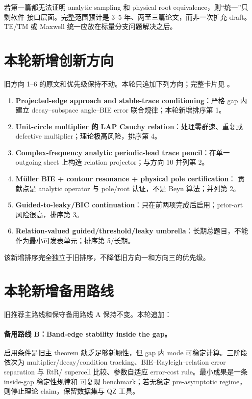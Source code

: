 \documentclass[UTF8,11pt,fontset=none]{ctexart}
\begin{document}
若第一篇都无法证明 analytic sampling 和 physical root equivalence，则“统一”只剩软件
接口层面。完整范围预计是 3--5 年、两至三篇论文，而非一次扩充 draft。TE/TM 或 Maxwell
统一应放在标量分支问题解决之后。

\section{本轮新增创新方向}

旧方向 1--6 的原文和优先级保持不动。本轮只追加下列方向；完整卡片见
。

\begin{enumerate}[start=7]
  \item \textbf{Projected-edge approach and stable-trace conditioning}：严格 gap
    内建立 decay--subspace angle--BIE error 联合规律；本轮新增排序第 1。
  \item \textbf{Unit-circle multiplier 的 LAP Cauchy relation}：处理零群速、重复或
    defective multiplier；理论极高风险，排序第 4。
  \item \textbf{Complex-frequency analytic periodic-lead trace pencil}：在单一
    outgoing sheet 上构造 relation projector；与方向 10 并列第 2。
  \item \textbf{Müller BIE + contour resonance + physical pole certification}：
    贡献点是 analytic operator 与 pole/root 认证，不是 Beyn 算法；并列第 2。
  \item \textbf{Guided-to-leaky/BIC continuation}：只在前两项完成后启用；prior-art
    风险很高，排序第 3。
  \item \textbf{Relation-valued guided/threshold/leaky umbrella}：长期总题目，不能
    作为最小可发表单元；排序第 5/长期。
\end{enumerate}

该新增排序完全独立于旧排序，不降低旧方向一和方向三的优先级。

\section{本轮新增备用路线}

旧推荐主路线和保守备用路线 A 保持不变。本轮追加：

\paragraph{备用路线 B：Band-edge stability inside the gap。}
启用条件是旧主 theorem 缺乏足够新颖性，但 gap 内 mode 可稳定计算。三阶段依次为
multiplier/decay/condition tracking、BIE--Rayleigh--relation error separation 与 RtR/
supercell 比较、参数自适应 error-cost rule。最小成果是一条 inside-gap 稳定性规律和
可复现 benchmark；若无稳定 pre-asymptotic regime，则停止理论 claim，保留数据集与 QZ
工具。
\end{document}
